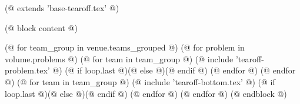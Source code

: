 (@ extends 'base-tearoff.tex' @)

(@ block content @)
    \pagestyle{tearoff}

    (@ for team_group in venue.teams_grouped @)
        (@ for problem in volume.problems @)
            (@ for team in team_group @)%
                (@ include 'tearoff-problem.tex' @)
                (@ if loop.last @)\newpage(@ else @)\vspace*{-1mm}(@ endif @)
            (@ endfor @)
        (@ endfor @)
        (@ for team in team_group @)%
            (@ include 'tearoff-bottom.tex' @)
            (@ if loop.last @)\newpage(@ else @)\vspace*{-1mm}(@ endif @)
        (@ endfor @)
    (@ endfor @)
(@ endblock @)
